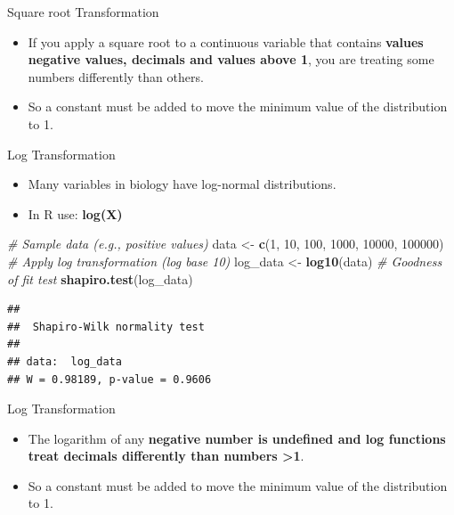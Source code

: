 \documentclass[
  ignorenonframetext,
]{beamer}
\newenvironment{Shaded}{\begin{snugshade}}{\end{snugshade}}
\newcommand{\CommentTok}[1]{\textcolor[rgb]{0.56,0.35,0.01}{\textit{#1}}}
\newcommand{\DecValTok}[1]{\textcolor[rgb]{0.00,0.00,0.81}{#1}}
\newcommand{\FunctionTok}[1]{\textcolor[rgb]{0.13,0.29,0.53}{\textbf{#1}}}
\newcommand{\NormalTok}[1]{#1}
\newcommand{\OtherTok}[1]{\textcolor[rgb]{0.56,0.35,0.01}{#1}}
\providecommand{\tightlist}{%
  \setlength{\itemsep}{0pt}\setlength{\parskip}{0pt}}
\begin{document}
\begin{frame}{Square root Transformation}
\label{square-root-transformation-1}
\begin{itemize}
\tightlist
\item
  If you apply a square root to a continuous variable that contains
  \textbf{values negative values, decimals and values above 1}, you are
  treating some numbers differently than others.
\end{itemize}

\begin{itemize}
\tightlist
\item
  So a constant must be added to move the minimum value of the
  distribution to 1.
\end{itemize}
\end{frame}

\begin{frame}[fragile]{Log Transformation}
\label{log-transformation}
\begin{itemize}
\item
  Many variables in biology have log-normal distributions.
\item
  In R use: \textbf{log(X)}
\end{itemize}

\begin{Shaded}
\begin{Highlighting}[]
\CommentTok{\# Sample data (e.g., positive values)}
\NormalTok{data }\OtherTok{\textless{}{-}} \FunctionTok{c}\NormalTok{(}\DecValTok{1}\NormalTok{, }\DecValTok{10}\NormalTok{, }\DecValTok{100}\NormalTok{, }\DecValTok{1000}\NormalTok{, }\DecValTok{10000}\NormalTok{, }\DecValTok{100000}\NormalTok{)}
\CommentTok{\# Apply log transformation (log base 10)}
\NormalTok{log\_data }\OtherTok{\textless{}{-}} \FunctionTok{log10}\NormalTok{(data)}
\CommentTok{\# Goodness of fit test}
\FunctionTok{shapiro.test}\NormalTok{(log\_data)}
\end{Highlighting}
\end{Shaded}

\begin{verbatim}
## 
##  Shapiro-Wilk normality test
## 
## data:  log_data
## W = 0.98189, p-value = 0.9606
\end{verbatim}
\end{frame}

\begin{frame}{Log Transformation}
\label{log-transformation-1}
\begin{itemize}
\tightlist
\item
  The logarithm of any \textbf{negative number is undefined and log
  functions treat decimals differently than numbers \textgreater1}.
\end{itemize}

\begin{itemize}
\tightlist
\item
  So a constant must be added to move the minimum value of the
  distribution to 1.
\end{itemize}
\end{frame}
\end{document}
